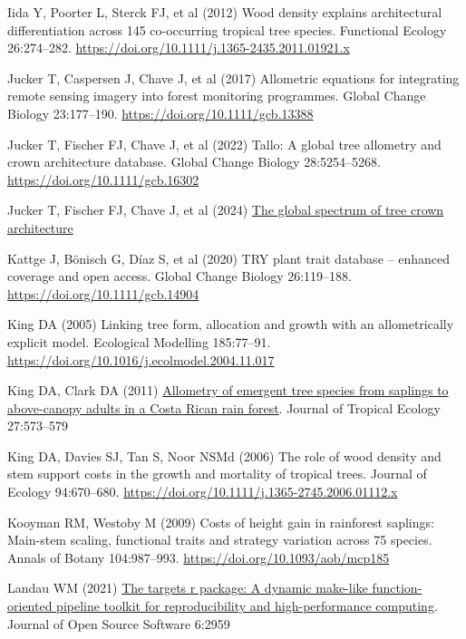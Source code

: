 \documentclass[
  12pt,
  letterpaper,
  DIV=11,
  numbers=noendperiod]{scrartcl}
\newlength{\cslhangindent}
\newenvironment{CSLReferences}[2] %
 {\begin{list}{}{%
  \setlength{\itemindent}{0pt}
  \setlength{\leftmargin}{0pt}
  \setlength{\parsep}{0pt}
  \ifodd #1
   \setlength{\leftmargin}{\cslhangindent}
   \setlength{\itemindent}{-1\cslhangindent}
  \fi
  \setlength{\itemsep}{#2\baselineskip}}}
 {\end{list}}
\begin{document}
\begin{CSLReferences}{1}{1}
Iida Y, Poorter L, Sterck FJ, et al (2012) Wood density explains
architectural differentiation across 145 co-occurring tropical tree
species. Functional Ecology 26:274--282.
\url{https://doi.org/10.1111/j.1365-2435.2011.01921.x}

Jucker T, Caspersen J, Chave J, et al (2017) Allometric equations for
integrating remote sensing imagery into forest monitoring programmes.
Global Change Biology 23:177--190.
\url{https://doi.org/10.1111/gcb.13388}

Jucker T, Fischer FJ, Chave J, et al (2022) Tallo: {A} global tree
allometry and crown architecture database. Global Change Biology
28:5254--5268. \url{https://doi.org/10.1111/gcb.16302}

Jucker T, Fischer FJ, Chave J, et al (2024)
\href{https://doi.org/10.1101/2024.09.14.613032}{The global spectrum of
tree crown architecture}

Kattge J, Bönisch G, Díaz S, et al (2020) {TRY} plant trait database --
enhanced coverage and open access. Global Change Biology 26:119--188.
\url{https://doi.org/10.1111/gcb.14904}

King DA (2005) Linking tree form, allocation and growth with an
allometrically explicit model. Ecological Modelling 185:77--91.
\url{https://doi.org/10.1016/j.ecolmodel.2004.11.017}

King DA, Clark DA (2011)
\href{https://www.jstor.org/stable/23012404}{Allometry of emergent tree
species from saplings to above-canopy adults in a {Costa} {Rican} rain
forest}. Journal of Tropical Ecology 27:573--579

King DA, Davies SJ, Tan S, Noor NSMd (2006) The role of wood density and
stem support costs in the growth and mortality of tropical trees.
Journal of Ecology 94:670--680.
\url{https://doi.org/10.1111/j.1365-2745.2006.01112.x}

Kooyman RM, Westoby M (2009) Costs of height gain in rainforest
saplings: Main-stem scaling, functional traits and strategy variation
across 75 species. Annals of Botany 104:987--993.
\url{https://doi.org/10.1093/aob/mcp185}

Landau WM (2021) \href{https://doi.org/10.21105/joss.02959}{The targets
r package: A dynamic make-like function-oriented pipeline toolkit for
reproducibility and high-performance computing}. Journal of Open Source
Software 6:2959


\end{CSLReferences}
\end{document}
